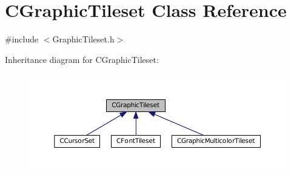 \hypertarget{classCGraphicTileset}{}\section{C\+Graphic\+Tileset Class Reference}
\label{classCGraphicTileset}


{\ttfamily \#include $<$Graphic\+Tileset.\+h$>$}



Inheritance diagram for C\+Graphic\+Tileset\+:\nopagebreak
\begin{figure}[H]
\begin{center}
\leavevmode
\includegraphics[width=350pt]{classCGraphicTileset__inherit__graph}
\end{center}
\end{figure}

